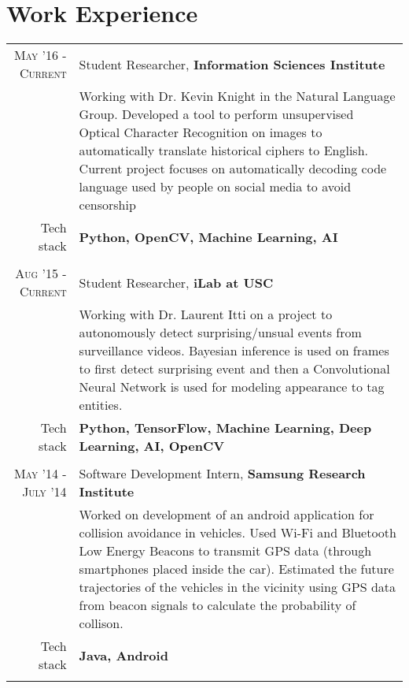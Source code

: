 \section{Work Experience}
\renewcommand{\arraystretch}{0.85}%
\begin{tabular}{r|p{13cm}}
\textsc{May '16 - Current} & Student Researcher, \textbf{Information Sciences Institute} \\
& \small{Working with Dr. Kevin Knight in the Natural Language Group. Developed a tool to perform unsupervised Optical Character Recognition on images to automatically translate historical ciphers to English. Current project focuses on automatically decoding code language used by people on social media to avoid censorship}\\
\small{Tech stack} &\footnotesize{\textbf{Python, OpenCV, Machine Learning, AI}} \\
\multicolumn{2}{c}{} \\

\textsc{Aug '15 - Current} & Student Researcher, \textbf{iLab at USC} \\
& \small{Working with Dr. Laurent Itti on a project to autonomously detect surprising/unsual events from surveillance videos. Bayesian inference is used on frames to first detect surprising event and then a Convolutional Neural Network is used for modeling appearance to tag entities.}\\
\small{Tech stack} &\footnotesize{\textbf{Python, TensorFlow, Machine Learning, Deep Learning, AI, OpenCV}} \\
\multicolumn{2}{c}{} \\

\textsc{May '14 - July '14 } & Software Development Intern, \textbf{Samsung Research Institute} \\
& \small{Worked on development of an android application for collision avoidance in vehicles. Used Wi-Fi and Bluetooth Low Energy Beacons to transmit GPS data (through smartphones placed inside the car). Estimated the future trajectories of the vehicles in the vicinity using GPS data from beacon signals to calculate the probability of collison.}\\
\small{Tech stack} &\footnotesize{\textbf{Java, Android}} \\
\multicolumn{2}{c}{}


\end{tabular}
